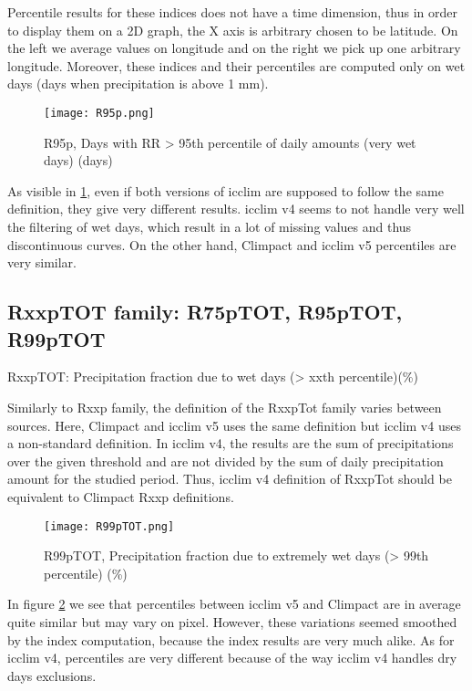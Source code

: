 \documentclass[a4paper,11pt]{article}
\begin{document}
            Percentile results for these indices does not have a time dimension, thus in order to display them on a 2D graph, the X axis is arbitrary chosen to be latitude.
            On the left we average values on longitude and on the right we pick up one arbitrary longitude.
            Moreover, these indices and their percentiles are computed only on wet days (days when precipitation is above 1 mm).

            \begin{figure}
                \centering
                \texttt{[image: R95p.png]}
                \caption{R95p, Days with RR > 95th percentile of daily amounts (very wet days) (days)}
                \label{figure/r95p}
            \end{figure}

            As visible in \ref{figure/r95p}, even if both versions of icclim are supposed to follow the same definition, they give very different results.
            icclim v4 seems to not handle very well the filtering of wet days, which result in a lot of missing values and thus discontinuous curves.
            On the other hand, Climpact and icclim v5 percentiles are very similar.

        \subsection{RxxpTOT family: R75pTOT, R95pTOT, R99pTOT}
        RxxpTOT: Precipitation fraction due to wet days (> xxth percentile)(\%)

        Similarly to Rxxp family, the definition of the RxxpTot family varies between sources. 
        Here, Climpact and icclim v5 uses the same definition but icclim v4 uses a non-standard definition. 
        In icclim v4, the results are the sum of precipitations over the given threshold and are not divided by the sum of daily precipitation amount for the studied period. 
        Thus, icclim v4 definition of RxxpTot should be equivalent to Climpact Rxxp definitions.

        \begin{figure}
            \centering
            \texttt{[image: R99pTOT.png]}
            \caption{R99pTOT, Precipitation fraction due to extremely wet days (> 99th percentile) (\%)}
            \label{figure/r99ptot}
        \end{figure}

        In figure \ref{figure/r99ptot} we see that percentiles between icclim v5 and Climpact are in average quite similar but may vary on pixel.
        However, these variations seemed smoothed by the index computation, because the index results are very much alike.
        As for icclim v4, percentiles are very different because of the way icclim v4 handles dry days exclusions. 
\end{document}
